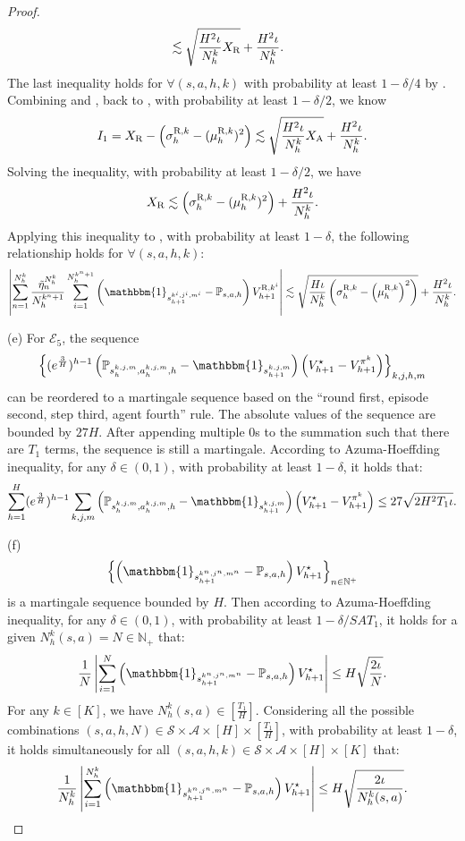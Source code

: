\documentclass{article}
\newcommand{\R}{\textnormal{R}}
\newcommand{\A}{\textnormal{A}}
\begin{document}
\begin{proof}
\begin{align}
        &\lesssim \sqrt{\frac{H^2\iota}{N_h^k}X_{\R}} + \frac{H^2\iota}{N_h^k}.
    \end{align}
    The last inequality holds for $\forall (s,a,h,k)$ with probability at least $1-\delta/4$ by . Combining  and , back to , with probability at least $1-\delta/2$, we know
    $$I_1 = X_{\R}-\left(\sigma_h^{\R,k}-(\mu_h^{\R,k})^2\right) \lesssim  \sqrt{\frac{H^2\iota}{N_h^k}X_{\A}} + \frac{H^2\iota}{N_h^k}.$$
    Solving the inequality, with probability at least $1-\delta/2$, we have
    $$X_{\R} \lesssim \left(\sigma_h^{\R,k}-(\mu_h^{\R,k})^2\right) + \frac{H^2\iota}{N_h^k}.$$
    Applying this inequality to , with probability at least $1-\delta$, the following relationship holds for $\forall (s,a,h,k)$:
    $$\left|\sum_{n=1}^{N_h^k} \frac{\Tilde{\eta}_n^{N_h^k}} {N_h^{k^n+1}}\sum_{i=1}^{N_h^{k^n+1}}\left(\mathbbm{1}_{s_{h+1}^{k^i,j^i,m^i}}-\mathbb{P}_{s,a,h}\right)V_{h+1}^{\R,k^i}\right| \lesssim \sqrt{\frac{H\iota}{N_h^k}\left(\sigma_h^{\R,k}-\left(\mu_h^{\R,k}\right)^2\right)} + \frac{H^2\iota}{N_h^k}.$$

    (e) For $\mathcal{E}_{5}$, the sequence 
    $$\left\{(e^{\frac{3}{H}})^{h-1}\left(\mathbb{P}_{s_h^{k,j,m},a_h^{k,j,m},h}-\mathbbm{1}_{s_{h+1}^{k,j,m}}\right)\left(V_{h+1}^{\star}-V_{h+1}^{\pi^k}\right)\right\}_{k,j,h,m}$$
    can be reordered to a martingale sequence based on the ``round first, episode second, step third, agent fourth” rule. The absolute values of the sequence are bounded by $27H$. After appending multiple 0s to the summation such that there are $T_1$ terms, the sequence is still a martingale. According to Azuma-Hoeffding inequality, for any $ \delta \in(0,1)$, with probability at least $1- \delta$, it holds that:
    $$\sum_{h=1}^H (e^{\frac{3}{H}})^{h-1}\sum_{k,j,m}\left(\mathbb{P}_{s_h^{k,j,m}, a_h^{k,j,m},h}-\mathbbm{1}_{s_{h+1}^{k,j,m}}\right)\left(V_{h+1}^{\star} - V_{h+1}^{\pi^k}\right) \leq 27\sqrt{2H^2T_1\iota}.$$

    (f) $$\left\{\left(\mathbbm{1}_{s_{h+1}^{k^n,j^n,m^n}}-\mathbb{P}_{s,a,h}\right)V_{h+1}^{\star}\right\}_{n\in \mathbb{N}^+}$$
    is a martingale sequence bounded by $H$. Then according to Azuma-Hoeffding inequality, for any $\delta \in (0,1)$, with probability at least $1-\delta/SAT_1$, it holds for a given $N_h^k(s,a) = N \in \mathbb{N}_{+}$ that:
    $$\frac{1}{N}\left|\sum_{i=1}^{N}\left(\mathbbm{1}_{s_{h+1}^{k^n,j^n,m^n}}-\mathbb{P}_{s,a,h}\right)V_{h+1}^{\star}\right|\leq H\sqrt{\frac{2\iota}{N}}.$$
    For any $k \in [K]$, we have $N_h^k(s,a) \in [\frac{T_1}{H}]$. Considering all the possible combinations $(s,a,h,N) \in \mathcal{S} \times \mathcal{A} \times [H] \times [\frac{T_1}{H}]$, with probability at least $1-\delta$, it holds simultaneously for all $(s,a,h,k) \in \mathcal{S} \times \mathcal{A} \times [H] \times [K]$ that:
    $$\frac{1}{N_h^k}\left|\sum_{i=1}^{N_h^k}\left(\mathbbm{1}_{s_{h+1}^{k^n,j^n,m^n}}-\mathbb{P}_{s,a,h}\right)V_{h+1}^{\star}\right|\leq H\sqrt{\frac{2\iota}{N_h^k(s,a)}}.$$


\end{proof}
\end{document}
